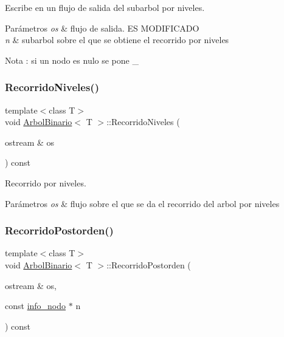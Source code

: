 Escribe en un flujo de salida del subarbol por niveles. 


\begin{DoxyParams}{Parámetros}
{\em os} & flujo de salida. ES M\+O\+D\+I\+F\+I\+C\+A\+DO \\
\hline
{\em n} & subarbol sobre el que se obtiene el recorrido por niveles \\
\hline
\end{DoxyParams}
\begin{DoxyNote}{Nota}
\+: si un nodo es nulo se pone \+\_\+ 
\end{DoxyNote}
\mbox{\label{classArbolBinario_af1617842b59246c0bbb6e2a81b7638b6}} 
\subsubsection{\texorpdfstring{Recorrido\+Niveles()}{RecorridoNiveles()}\hspace{0.1cm}{\footnotesize\ttfamily [2/2]}}
{\footnotesize\ttfamily template$<$class T$>$ \\
void \hyperlink{classArbolBinario}{Arbol\+Binario}$<$ T $>$\+::Recorrido\+Niveles (\begin{DoxyParamCaption}\item[{ostream \&}]{os }\end{DoxyParamCaption}) const}



Recorrido por niveles. 


\begin{DoxyParams}{Parámetros}
{\em os} & flujo sobre el que se da el recorrido del arbol por niveles \\
\hline
\end{DoxyParams}
\mbox{\label{classArbolBinario_a84f79da821dfe396411e9a3145222199}} 
\subsubsection{\texorpdfstring{Recorrido\+Postorden()}{RecorridoPostorden()}}
{\footnotesize\ttfamily template$<$class T$>$ \\
void \hyperlink{classArbolBinario}{Arbol\+Binario}$<$ T $>$\+::Recorrido\+Postorden (\begin{DoxyParamCaption}\item[{ostream \&}]{os,  }\item[{const \hyperlink{structArbolBinario_1_1info__nodo}{info\+\_\+nodo} $\ast$}]{n }\end{DoxyParamCaption}) const\hspace{0.3cm}{\ttfamily [private]}}



